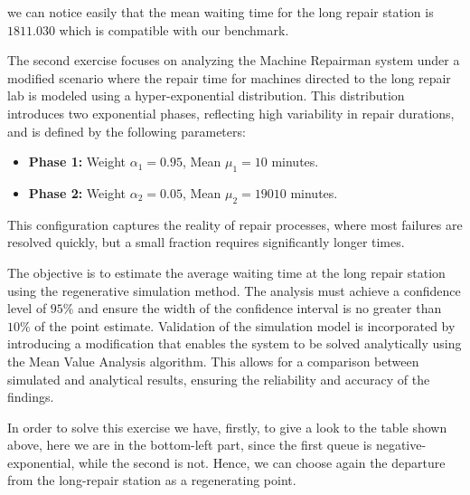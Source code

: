 \documentclass[12pt]{article}
\begin{document}
	
	we can notice easily that the mean waiting time for the long repair station is $1811.030$ which is compatible with our benchmark. 
	
	The second exercise focuses on analyzing the Machine Repairman system under a modified scenario where the repair time for machines directed to the long repair lab is modeled using a hyper-exponential distribution. This distribution introduces two exponential phases, reflecting high variability in repair durations, and is defined by the following parameters:
	
	\begin{itemize}
		\item \textbf{Phase 1:} Weight $\alpha_1 = 0.95$, Mean $\mu_1 = 10$ minutes.
		\item \textbf{Phase 2:} Weight $\alpha_2 = 0.05$, Mean $\mu_2 = 19010$ minutes.
	\end{itemize}
	
	This configuration captures the reality of repair processes, where most failures are resolved quickly, but a small fraction requires significantly longer times.
	
	The objective is to estimate the average waiting time at the long repair station using the regenerative simulation method. The analysis must achieve a confidence level of $95\%$ and ensure the width of the confidence interval is no greater than $10\%$ of the point estimate. Validation of the simulation model is incorporated by introducing a modification that enables the system to be solved analytically using the Mean Value Analysis algorithm. This allows for a comparison between simulated and analytical results, ensuring the reliability and accuracy of the findings.
	
	In order to solve this exercise we have, firstly, to give a look to the table shown above, here we are in the bottom-left part, since the first queue is negative-exponential, while the second is not. Hence, we can choose again the departure from the long-repair station as a regenerating point.
	
	
\end{document}
